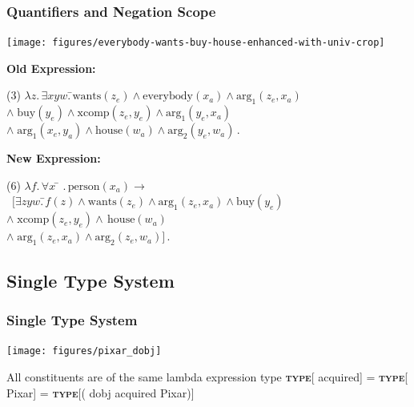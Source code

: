 \documentclass[mathserif,12pt]{beamer}
\newcommand\type[1]{\textbf{\textsc{type}}[#1]\xspace}
\renewcommand{\land}{\wedge}
\newcommand{\lspace}{.\,}
\begin{document}
\begin{frame}
\frametitle{Quantifiers and Negation Scope}
\centering
\texttt{[image: figures/everybody-wants-buy-house-enhanced-with-univ-crop]}

\raggedright \textbf{Old Expression:}
\begin{tabbing}
(3) $\lambda z \lspace \exists xyw \lspace$\=$\mathrm{wants}(z_e) \land \mathrm{everybody}(x_a) \land \mathrm{arg_1}(z_e, x_a) $\\
\>$\land\; \mathrm{buy}(y_e) \land \mathrm{xcomp}(z_e, y_e) \land \mathrm{arg_1}(y_e, x_a)$\\
\>$\land \; \mathrm{arg_1}(x_e,y_a) \land \mathrm{house}(w_a) \land \mathrm{arg_2}(y_e, w_a)$\,.
\end{tabbing}

\raggedright \textbf{New Expression:}
\begin{tabbing}
(6) $\lambda f \lspace \forall x$ \= $\lspace \mathrm{person}(x_a) \rightarrow$\\\
\>$[\exists zyw \lspace$\=$f(z) \land \mathrm{wants}(z_e) \land \mathrm{arg_1}(z_e, x_a)\land \mathrm{buy}(y_e)$\\
\>\>$\land\; \mathrm{xcomp}(z_e, y_e) \land\, \mathrm{house}(w_a)$\\
\>\>$\land\; \mathrm{arg_1}(z_e, x_a) \land \mathrm{arg_2}(z_e, w_a)]$\,.
\end{tabbing}

\end{frame} 



\subsection{Single Type System}

\begin{frame}[noframenumbering]
\frametitle{Single Type System}
\vspace{-3em}
\begin{center}
\texttt{[image: figures/pixar\_dobj]}


\end{center}

\vspace{1cm}

\begin{block}{\centering All constituents are of the same lambda expression type}
\centering
\vspace{0.1cm}
\type{{\color{blue} acquired}} =  \type{{\color{blue!40!green!60!black} Pixar}}  = \type{{({\color{red} dobj} {\color{blue} acquired} {\color{blue!40!green!60!black} Pixar})}}
\vspace{0.1cm}
\end{block}
\end{frame}
\end{document}
